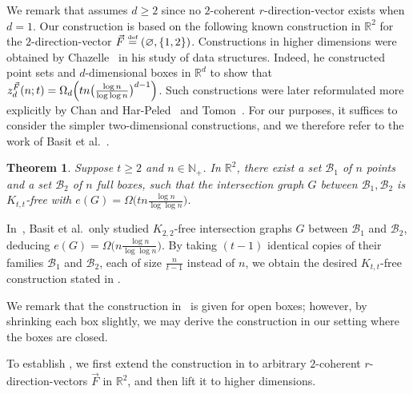 \documentclass[11pt]{article}
\newtheorem{theorem}{Theorem}[section]
\theoremstyle{definition}
\newcommand*{\eqdef}{\stackrel{\mbox{\normalfont\tiny def}}{=}} %
\newcommand*{\N}{\mathbb{N}}                                    %
\newcommand*{\R}{\mathbb{R}}                                    %
\newcommand*{\vF}{\vec{F}}
\newcommand*{\cB}{\mathcal{B}}
\begin{document}
We remark that  assumes $d \ge 2$ since no $2$-coherent $r$-direction-vector exists when $d = 1$.
Our construction is based on the following known construction in $\R^2$ for the $2$-direction-vector $\vF \eqdef (\varnothing, \{1, 2\})$.
Constructions in higher dimensions were obtained by Chazelle~\cite{chazelle} in his study of data structures. Indeed, he constructed point sets and $d$-dimensional boxes in $\R^d$ to show that $z_d^{\vF}(n; t) = \Omega_d \Bigl( tn \bigl( \frac{\log n}{\log\log n} \bigr)^{d-1} \Bigr)$. Such constructions were later reformulated more explicitly by Chan and Har-Peled~\cite[Appendix~B]{chan_har-peled} and Tomon~\cite{tomon}. For our purposes, it suffices to consider the simpler two-dimensional constructions, and we therefore refer to the work of Basit et al.~\cite{basit_etal}. 



\begin{theorem} \label{thm:point_rect}
   Suppose $t \ge 2$ and $n \in \N_+$. In $\R^2$, there exist a set $\cB_1$ of $n$ points and a set $\cB_2$ of $n$ full boxes, such that the intersection graph $G$ between $\cB_1, \cB_2$ is $K_{t, t}$-free with $e(G) = \Omega \bigl( tn\frac{\log n}{\log\log n} \bigr)$.
\end{theorem}

In~\cite{basit_etal}, Basit et al.~only studied $K_{2, 2}$-free intersection graphs $G$ between $\cB_1$ and $\cB_2$, deducing $e(G) = \Omega \bigl( n \frac{\log n}{\log\log n} \bigr)$. By taking $(t - 1)$ identical copies of their families $\cB_1$ and $\cB_2$, each of size $\frac{n}{t-1}$ instead of $n$, we obtain the desired $K_{t, t}$-free construction stated in .

We remark that the construction in~\cite{basit_etal} is given for open boxes; however, by shrinking each box slightly, we may derive the construction in our setting where the boxes are closed. 

To establish , we first extend the construction in  to arbitrary $2$-coherent $r$-direction-vectors $\vF$ in $\mathbb{R}^2$, and then lift it to higher dimensions.
\end{document}
